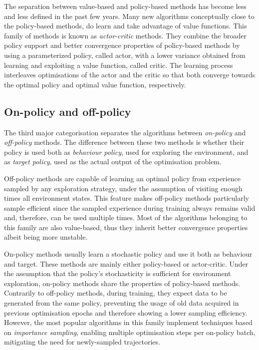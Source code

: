 The separation between value-based and policy-based methods has become less and less defined in the past few years.
Many new algorithms conceptually close to the policy-based methods, do learn and take advantage of value functions.
This family of methods is known as \emph{actor-critic} methods.
They combine the broader policy support and better convergence properties of policy-based methods by using a parameterized policy, called actor, with a lower variance obtained from learning and exploiting a value function, called critic.
The learning process interleaves optimisations of the actor and the critic so that both converge towards the optimal policy and optimal value function, respectively.

\subsection{On-policy and off-policy}

The third major categorisation separates the algorithms between \emph{on-policy} and \emph{off-policy} methods.
The difference between these two methods is whether their policy is used both as \emph{behaviour policy}, used for exploring the environment, and as \emph{target policy}, used as the actual output of the optimisation problem.

Off-policy methods are capable of learning an optimal policy from experience sampled by any exploration strategy, under the assumption of visiting enough times all environment states.
This feature makes off-policy methods particularly sample efficient since the sampled experience during training always remains valid and, therefore, can be used multiple times.
Most of the algorithms belonging to this family are also value-based, thus they inherit better convergence properties albeit being more unstable.

On-policy methods usually learn a stochastic policy and use it both as behaviour and target.
These methods are mainly either policy-based or actor-critic.
Under the assumption that the policy's stochasticity is sufficient for environment exploration, on-policy methods share the properties of policy-based methods.
Contrarily to off-policy methods, during training, they expect data to be generated from the same policy, preventing the usage of old data acquired in previous optimisation epochs and therefore showing a lower sampling efficiency.
However, the most popular algorithms in this family implement techniques based on \emph{importance sampling}, enabling multiple optimisation steps per on-policy batch, mitigating the need for newly-sampled trajectories.

